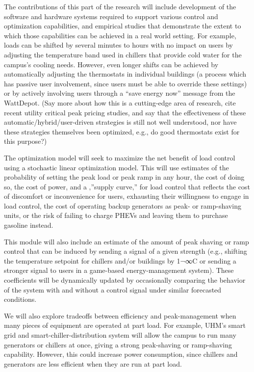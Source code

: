 The contributions of this part of the research will include development of
the software and hardware systems required to support various control and
optimization capabilities, and empirical studies that demonstrate the
extent to which those capabilities can be achieved in a real world
setting. For example, loads can be shifted by several minutes to hours with
no impact on users by adjusting the temperature band used in chillers that
provide cold water for the campus's cooling needs. However, even longer
shifts can be achieved by automatically adjusting the thermostats in
individual buildings (a process which has passive user involvement, since
users must be able to override these settings) or by actively involving
users through a ``save energy now'' message from the WattDepot. (Say more
about how this is a cutting-edge area of research, cite recent utility
critical peak pricing studies, and say that the effectiveness of these
automatic/hybrid/user-driven strategies is still not well understood, nor
have these strategies themselves been optimized, e.g., do good thermostats
exist for this purpose?)

The optimization model will seek to maximize the net benefit of load
control using a stochastic linear optimization model. This will use
estimates of the probability of setting the peak load or peak ramp in any
hour, the cost of doing so, the cost of power, and a ‚''supply curve‚'' for
load control that reflects the cost of discomfort or inconvenience for
users, exhausting their willingness to engage in load control, the cost of
operating backup generators as peak- or ramp-shaving units, or the risk of
failing to charge PHEVs and leaving them to purchase gasoline instead.

This module will also include an estimate of the amount of peak shaving or
ramp control that can be induced by sending a signal of a given strength
(e.g., shifting the temperature setpoint for chillers and/or buildings by
1¬∞C or sending a stronger signal to users in a game-based
energy-management system). These coefficients will be dynamically updated
by occasionally comparing the behavior of the system with and without a
control signal under similar forecasted conditions.

We will also explore tradeoffs between efficiency and peak-management when
many pieces of equipment are operated at part load. For example, UHM's
smart grid and smart-chiller-distribution system will allow the campus to
run many generators or chillers at once, giving a strong peak-shaving or
ramp-shaving capability. However, this could increase power consumption,
since chillers and generators are less efficient when they are run at part
load.


